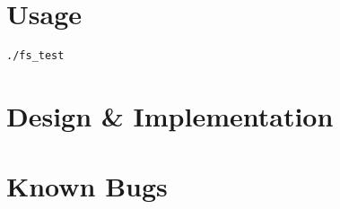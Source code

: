 \documentclass[paper=a4, fontsize=11pt]{scrartcl}
\begin{document}
\section*{Usage}
\texttt{./fs\_test}

\section*{Design \& Implementation}

\section*{Known Bugs}
\end{document}
